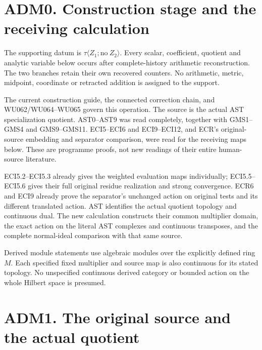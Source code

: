 \section{ADM0. Construction stage and the receiving
calculation}\label{adm0.-construction-stage-and-the-receiving-calculation}

The supporting datum is \(\tau\langle Z_1;\mathrm{no}\ Z_2\rangle\).
Every scalar, coefficient, quotient and analytic variable below occurs
after complete-history arithmetic reconstruction. The two branches
retain their own recovered counters. No arithmetic, metric, midpoint,
coordinate or retracted addition is assigned to the support.

The current construction guide, the connected correction chain, and
WU062/WU064--WU065 govern this operation. The source is the actual AST
specialization quotient. AST0--AST9 was read completely, together with
GMS1--GMS4 and GMS9--GMS11. ECI5--ECI6 and ECI9--ECI12, and ECR's
original-source embedding and separator comparison, were read for the
receiving maps below. These are programme proofs, not new readings of
their entire human-source literature.

ECI5.2--ECI5.3 already gives the weighted evaluation maps individually;
ECI5.5--ECI5.6 gives their full original residue realization and strong
convergence. ECR6 and ECI9 already prove the separator's unchanged
action on original tests and its different translated action. AST
identifies the actual quotient topology and continuous dual. The new
calculation constructs their common multiplier domain, the exact action
on the literal AST complexes and continuous transposes, and the complete
normal-ideal comparison with that same source.

Derived module statements use algebraic modules over the explicitly
defined ring \(M\). Each specified fixed multiplier and source map is
also continuous for its stated topology. No unspecified continuous
derived category or bounded action on the whole Hilbert space is
presumed.

\section{ADM1. The original source and the actual
quotient}\label{adm1.-the-original-source-and-the-actual-quotient}

